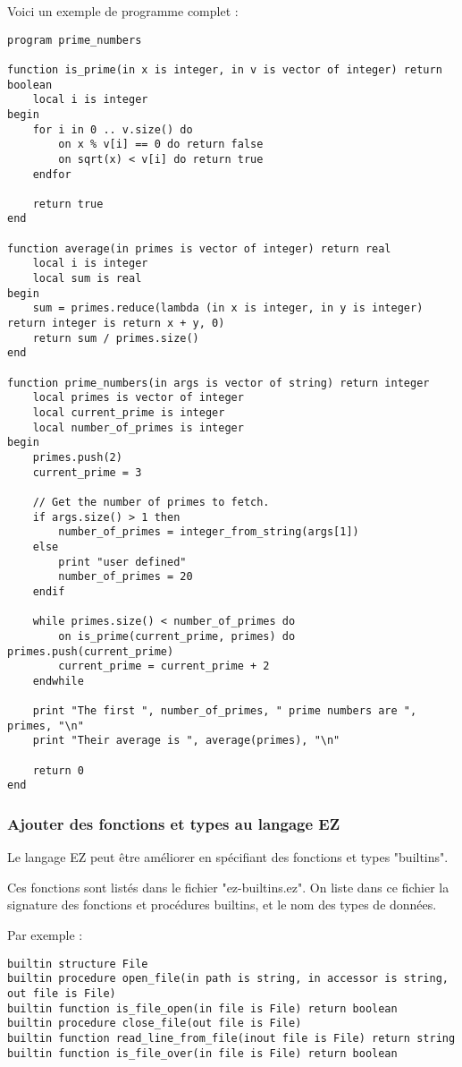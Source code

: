 Voici un exemple de programme complet :
\begin{verbatim}
program prime_numbers

function is_prime(in x is integer, in v is vector of integer) return boolean
    local i is integer
begin
    for i in 0 .. v.size() do
        on x % v[i] == 0 do return false
        on sqrt(x) < v[i] do return true
    endfor

    return true
end

function average(in primes is vector of integer) return real
    local i is integer
    local sum is real
begin
    sum = primes.reduce(lambda (in x is integer, in y is integer) return integer is return x + y, 0)
    return sum / primes.size()
end

function prime_numbers(in args is vector of string) return integer
    local primes is vector of integer
    local current_prime is integer
    local number_of_primes is integer
begin
    primes.push(2)
    current_prime = 3

    // Get the number of primes to fetch.
    if args.size() > 1 then
        number_of_primes = integer_from_string(args[1])
    else
        print "user defined"
        number_of_primes = 20
    endif

    while primes.size() < number_of_primes do
        on is_prime(current_prime, primes) do primes.push(current_prime)
        current_prime = current_prime + 2
    endwhile

    print "The first ", number_of_primes, " prime numbers are ", primes, "\n"
    print "Their average is ", average(primes), "\n"

    return 0
end
\end{verbatim}

\subsubsection{Ajouter des fonctions et types au langage EZ}

Le langage EZ peut être améliorer en spécifiant des fonctions et types
"builtins".

Ces fonctions sont listés dans le fichier "ez-builtins.ez". On liste dans
ce fichier la signature des fonctions et procédures builtins, et le nom des
types de données.

Par exemple :
\begin{verbatim}
builtin structure File
builtin procedure open_file(in path is string, in accessor is string, out file is File)
builtin function is_file_open(in file is File) return boolean
builtin procedure close_file(out file is File)
builtin function read_line_from_file(inout file is File) return string
builtin function is_file_over(in file is File) return boolean
\end{verbatim}


